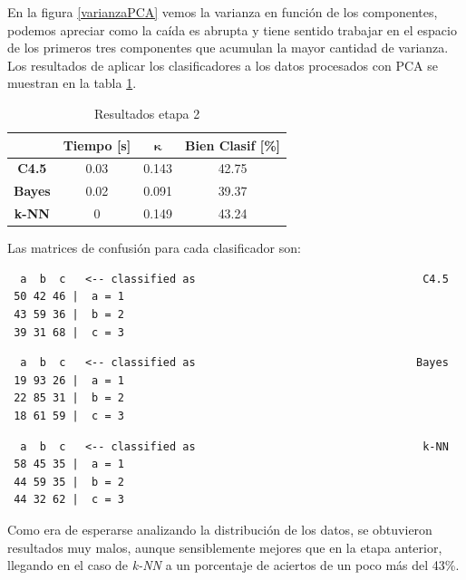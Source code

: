 \documentclass[12pt,a4paper,titlepage]{report}
\newcommand{\bs}{\boldsymbol}
\begin{document}
En la figura \ref{varianzaPCA} vemos la varianza en función de los componentes, podemos apreciar como la caída es abrupta y tiene sentido trabajar en el espacio de los primeros tres componentes que acumulan la mayor cantidad de varianza.\\

Los resultados de aplicar los clasificadores a los datos procesados con PCA se muestran en la tabla \ref{tab:resultados_PCA}.
\begin{table}[H]
\centering
	\begin{tabular}{c|c|c|c|} 
	\cline{2-4}
	& \multicolumn{1}{c|}{\cellcolor[gray]{0.7} \textbf{Tiempo [s]}}  
	& \multicolumn{1}{c|}{\cellcolor[gray]{0.7} $\bs\kappa$}
	& \multicolumn{1}{c|}{\cellcolor[gray]{0.7} \textbf{Bien Clasif [\%]}} \\ \hline
	
	\multicolumn{1}{|c|}{\cellcolor[gray]{0.8} \textbf{C4.5}}   & 0.03 & 0.143 & \cellcolor[gray]{0.9}42.75  \\ \hline
	\multicolumn{1}{|c|}{\cellcolor[gray]{0.8} \textbf{Bayes}}  & 0.02 & 0.091 & \cellcolor[gray]{0.9}39.37 \\ \hline
	\multicolumn{1}{|c|}{\cellcolor[gray]{0.8} \textbf{k-NN}}   & 0    & 0.149 & \cellcolor[gray]{0.9}43.24 \\ \hline
	\end{tabular} 
	\caption{Resultados etapa 2}
	\label{tab:resultados_PCA}
\end{table}
Las matrices de confusión para cada clasificador son:
\vspace{-10pt}
\begin{lstlisting}
  a  b  c   <-- classified as									C4.5
 50 42 46 |  a = 1
 43 59 36 |  b = 2
 39 31 68 |  c = 3
\end{lstlisting}
\vspace{-1cm}
\begin{lstlisting}
  a  b  c   <-- classified as								   Bayes
 19 93 26 |  a = 1
 22 85 31 |  b = 2
 18 61 59 |  c = 3
\end{lstlisting}
\vspace{-1cm}
\begin{lstlisting}
  a  b  c   <-- classified as									k-NN
 58 45 35 |  a = 1
 44 59 35 |  b = 2
 44 32 62 |  c = 3
\end{lstlisting}

Como era de esperarse analizando la distribución de los datos, se obtuvieron resultados muy malos, aunque sensiblemente mejores que en la etapa anterior, llegando en el caso de \emph{k-NN} a un porcentaje de aciertos de un poco más del 43\%.\\
\end{document}
